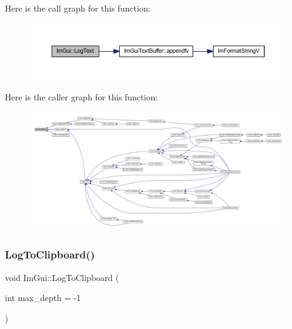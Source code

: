 Here is the call graph for this function\+:
\nopagebreak
\begin{figure}[H]
\begin{center}
\leavevmode
\includegraphics[width=350pt]{namespace_im_gui_aa548475d8f771ab6524d73d900a41198_cgraph}
\end{center}
\end{figure}
Here is the caller graph for this function\+:
\nopagebreak
\begin{figure}[H]
\begin{center}
\leavevmode
\includegraphics[width=350pt]{namespace_im_gui_aa548475d8f771ab6524d73d900a41198_icgraph}
\end{center}
\end{figure}
\mbox{\label{namespace_im_gui_a81add991d176834b8a6e315dfc78e4f7}} 
\subsubsection{\texorpdfstring{Log\+To\+Clipboard()}{LogToClipboard()}}
{\footnotesize\ttfamily void Im\+Gui\+::\+Log\+To\+Clipboard (\begin{DoxyParamCaption}\item[{int}]{max\+\_\+depth = {\ttfamily -\/1} }\end{DoxyParamCaption})}

